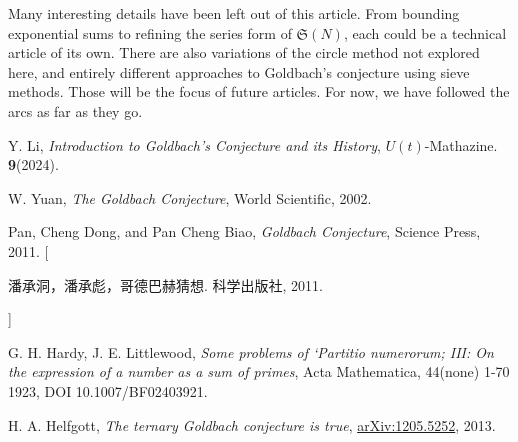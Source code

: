 \documentclass{article}
\begin{document}
Many interesting details have been left out of this article. From bounding exponential sums to refining the series form of $\mathfrak{S}(N)$, each could be a technical article of its own. There are also variations of the circle method not explored here, and entirely different approaches to Goldbach's conjecture using sieve methods. Those will be the focus of future articles. For now, we have followed the arcs as far as they go.

\begin{thebibliography}{9}
Y. Li, \textit{Introduction to Goldbach’s Conjecture and its History}, $U(t)$-Mathazine. \textbf{9}(2024).

W. Yuan, \textit{The Goldbach Conjecture}, World Scientific, 2002. 

Pan, Cheng Dong, and Pan Cheng Biao, \textit{Goldbach Conjecture}, Science Press, 2011. [\begin{CJK*}{UTF8}{gbsn}潘承洞，潘承彪，哥德巴赫猜想. 科学出版社, 2011.\end{CJK*}] 

G. H. Hardy, J. E. Littlewood, \textit{Some problems of ‘Partitio numerorum; III: On the expression of a number as
a sum of primes},  Acta Mathematica, 44(none) 1-70 1923,
DOI 10.1007/BF02403921.

H. A. Helfgott, \textit{The ternary Goldbach conjecture is true}, \href{https://arxiv.org/abs/1312.7748}{arXiv:1205.5252}, 2013.

\end{thebibliography}
\end{document}
